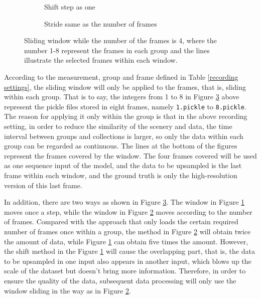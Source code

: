 \begin{figure}
    \centering
    \hspace{-0.4cm}
    \begin{subfigure}{0.49\textwidth}
        \centering
        \caption{Shift step as one}
        \label{shift step as one}
    \end{subfigure}
    \begin{subfigure}{0.49\textwidth}
        \centering
        \caption{Stride same as the number of frames}
        \label{shift step as the fol value}
    \end{subfigure}
    \caption{Sliding window while the number of the frames is 4, where the number 1-8 represent the frames in each group and the lines illustrate the selected frames within each window.}
	\label{sliding window}
\end{figure}

According to the measurement, group and frame defined in Table \ref{recording settings}, the sliding window will only be applied to the frames, that is, sliding within each group. That is to say, the integers from 1 to 8 in Figure \ref{sliding window} above represent the pickle files stored in eight frames, namely \texttt{1.pickle} to \texttt{8.pickle}. The reason for applying it only within the group is that in the above recording setting, in order to reduce the similarity of the scenery and data, the time interval between groups and collections is larger, so only the data within each group can be regarded as continuous. The lines at the bottom of the figures represent the frames covered by the window. The four frames covered will be used as one sequence input of the model, and the data to be upsampled is the last frame within each window, and the ground truth is only the high-resolution version of this last frame.

In addition, there are two ways as shown in Figure \ref{sliding window}. The window in Figure \ref{shift step as one} moves once a step, while the window in Figure \ref{shift step as the fol value} moves according to the number of frames. Compared with the approach that only loads the certain required number of frames once within a group, the method in Figure \ref{shift step as the fol value} will obtain twice the amount of data, while Figure \ref{shift step as one} can obtain five times the amount. However, the shift method in the Figure \ref{shift step as one} will cause the overlapping part, that is, the data to be upsampled in one input also appears in another input, which blows up the scale of the dataset but doesn't bring more information. Therefore, in order to ensure the quality of the data, subsequent data processing will only use the window sliding in the way as in Figure \ref{shift step as the fol value}.

